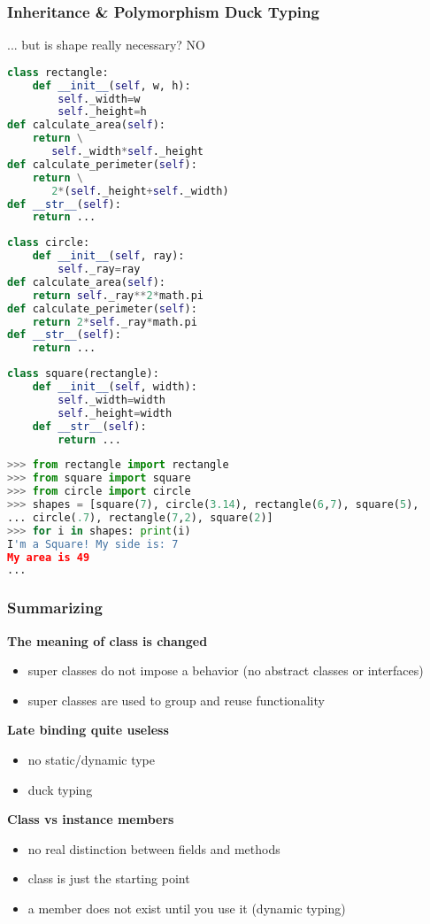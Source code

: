 \subsubsection{Inheritance \& Polymorphism Duck Typing}

... but is shape really necessary? NO

\begin{lstlisting}[language=Python]
class rectangle:
	def __init__(self, w, h):
		self._width=w
		self._height=h
def calculate_area(self):
	return \
	   self._width*self._height
def calculate_perimeter(self):
	return \
	   2*(self._height+self._width)
def __str__(self):
	return ...
\end{lstlisting}

\begin{lstlisting}[language=Python]
class circle:
	def __init__(self, ray):
		self._ray=ray
def calculate_area(self):
	return self._ray**2*math.pi
def calculate_perimeter(self):
	return 2*self._ray*math.pi
def __str__(self):
	return ...
\end{lstlisting}

\begin{lstlisting}[language=Python]
class square(rectangle): 
	def __init__(self, width):
		self._width=width
		self._height=width
	def __str__(self):
		return ...
\end{lstlisting}

\begin{lstlisting}[language=Python]
>>> from rectangle import rectangle
>>> from square import square
>>> from circle import circle
>>> shapes = [square(7), circle(3.14), rectangle(6,7), square(5),
... circle(.7), rectangle(7,2), square(2)]
>>> for i in shapes: print(i)
I'm a Square! My side is: 7
My area is 49
... 
\end{lstlisting}

\subsubsection{Summarizing}

\textbf{The meaning of class is changed}
\begin{itemize}
	\item super classes do not impose a behavior (no abstract classes or interfaces)
	\item super classes are used to group and reuse functionality
\end{itemize}

\textbf{Late binding quite useless}
\begin{itemize}
	\item no static/dynamic type
	\item duck typing
\end{itemize}

\textbf{Class vs instance members}
\begin{itemize}
	\item no real distinction between fields and methods
	\item class is just the starting point
	\item a member does not exist until you use it (dynamic typing)
\end{itemize}
